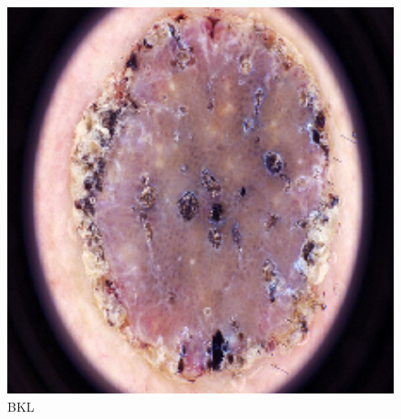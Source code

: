 \begin{figure}[t]
    \begin{minipage}[b] {0.32\textwidth}
        \includegraphics[width=1\textwidth]{Images/bkl.png}
        \caption{BKL}
    \end{minipage} 

\end{figure}
